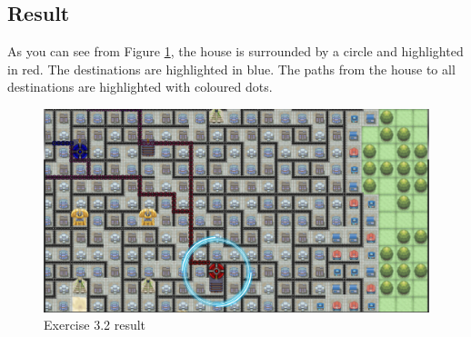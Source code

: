 \documentclass[10pt,a4paper]{article}
\begin{document}
\subsection*{Result}
As you can see from Figure \ref{img:Ex3-2}, the house is surrounded by a circle and highlighted in red. The destinations are highlighted in blue. The paths from the house to all destinations are highlighted with coloured dots.

\begin{figure}
\centering
\includegraphics[scale=0.2]{img/exercise4}
\caption{Exercise 3.2 result}
\label{img:Ex3-2}
\end{figure}
\end{document}
